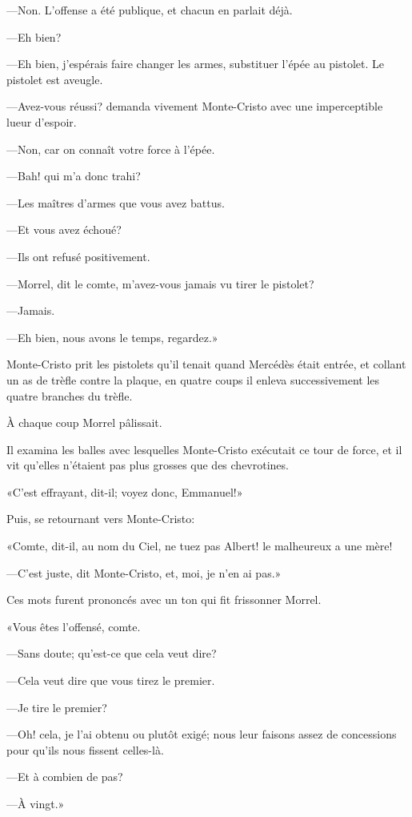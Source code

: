 —Non. L'offense a été publique, et chacun en parlait déjà. 

—Eh bien? 

—Eh bien, j'espérais faire changer les armes, substituer l'épée au pistolet. Le pistolet est aveugle. 

—Avez-vous réussi? demanda vivement Monte-Cristo avec une imperceptible lueur d'espoir. 

—Non, car on connaît votre force à l'épée. 

—Bah! qui m'a donc trahi? 

—Les maîtres d'armes que vous avez battus. 

—Et vous avez échoué? 

—Ils ont refusé positivement. 

—Morrel, dit le comte, m'avez-vous jamais vu tirer le pistolet? 

—Jamais. 

—Eh bien, nous avons le temps, regardez.» 

Monte-Cristo prit les pistolets qu'il tenait quand Mercédès était entrée, et collant un as de trèfle contre la plaque, en quatre coups il enleva successivement les quatre branches du trèfle. 

À chaque coup Morrel pâlissait. 

Il examina les balles avec lesquelles Monte-Cristo exécutait ce tour de force, et il vit qu'elles n'étaient pas plus grosses que des chevrotines. 

«C'est effrayant, dit-il; voyez donc, Emmanuel!» 

Puis, se retournant vers Monte-Cristo: 

«Comte, dit-il, au nom du Ciel, ne tuez pas Albert! le malheureux a une mère! 

—C'est juste, dit Monte-Cristo, et, moi, je n'en ai pas.» 

Ces mots furent prononcés avec un ton qui fit frissonner Morrel. 

«Vous êtes l'offensé, comte. 

—Sans doute; qu'est-ce que cela veut dire? 

—Cela veut dire que vous tirez le premier. 

—Je tire le premier? 

—Oh! cela, je l'ai obtenu ou plutôt exigé; nous leur faisons assez de concessions pour qu'ils nous fissent celles-là. 

—Et à combien de pas? 

—À vingt.» 

